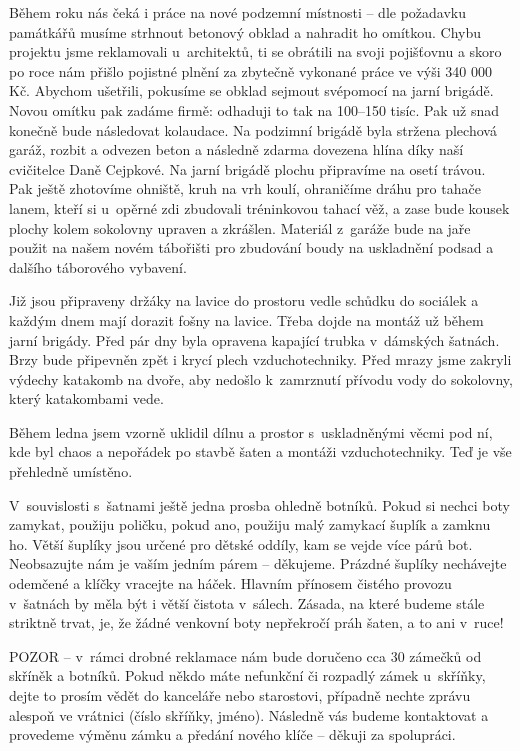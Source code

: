 \documentclass[11pt]{article}
\begin{document}
Během roku nás čeká i práce na nové podzemní místnosti – dle požadavku památkářů musíme strhnout betonový obklad a nahradit ho omítkou. Chybu projektu jsme reklamovali u~architektů, ti se obrátili na svoji pojišťovnu a skoro po roce nám přišlo pojistné plnění za zbytečně vykonané práce ve výši 340 000 Kč. Abychom ušetřili, pokusíme se obklad sejmout svépomocí na jarní brigádě. Novou omítku pak zadáme firmě: odhaduji to tak na 100–150 tisíc. Pak už snad konečně bude následovat kolaudace.
Na podzimní brigádě byla stržena plechová garáž, rozbit a odvezen beton a následně zdarma dovezena hlína díky naší cvičitelce Daně Cejpkové. Na jarní brigádě plochu připravíme na osetí trávou. Pak ještě zhotovíme ohniště, kruh na vrh koulí, ohraničíme dráhu pro tahače lanem, kteří si u~opěrné zdi zbudovali tréninkovou tahací věž, a zase bude kousek plochy kolem sokolovny upraven a zkrášlen.
Materiál z~garáže bude na jaře použit na našem novém tábořišti pro zbudování boudy na uskladnění podsad a dalšího táborového vybavení.

\clearpage
{}
Již jsou připraveny držáky na lavice do prostoru vedle schůdku do sociálek a každým dnem mají dorazit fošny na lavice. Třeba dojde na montáž už během jarní brigády.
Před pár dny byla opravena kapající trubka v~dámských šatnách. Brzy bude připevněn zpět i krycí plech vzduchotechniky.
Před mrazy jsme zakryli výdechy katakomb na dvoře, aby nedošlo k~zamrznutí přívodu vody do sokolovny, který katakombami vede. 

Během ledna jsem vzorně uklidil dílnu a prostor s~uskladněnými věcmi pod ní, kde byl chaos a nepořádek po stavbě šaten a montáži vzduchotechniky. Teď je vše přehledně umístěno.

V~souvislosti s~šatnami ještě jedna prosba ohledně botníků. Pokud si nechci boty zamykat, použiju poličku, pokud ano, použiju malý zamykací šuplík a zamknu ho. Větší šuplíky jsou určené pro dětské oddíly, kam se vejde více párů bot. Neobsazujte nám je vaším jedním párem – děkujeme. Prázdné šuplíky nechávejte odemčené a klíčky vracejte na háček. 
Hlavním přínosem čistého provozu v~šatnách by měla být i větší čistota v~sálech. Zásada, na které budeme stále striktně trvat, je, že žádné venkovní boty nepřekročí práh šaten, a to ani v~ruce!

POZOR – v~rámci drobné reklamace nám bude doručeno cca 30 zámečků od skříněk a botníků. Pokud někdo máte nefunkční či rozpadlý zámek u~skříňky, dejte to prosím vědět do kanceláře nebo starostovi, případně nechte zprávu alespoň ve vrátnici (číslo skříňky, jméno). Následně vás budeme kontaktovat a provedeme výměnu zámku a předání nového klíče – děkuji za spolupráci.
 
\end{document}

